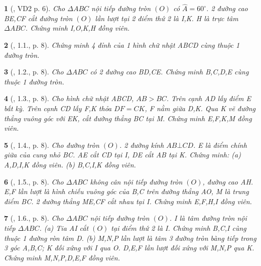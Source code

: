 \documentclass{article}
\newtheorem{baitoan}{}
\begin{document}
\begin{baitoan}[\cite{Thu_Chung_Viet_Minh_circ}, VD2 p. 6]
	Cho $\Delta ABC$ nội tiếp đường tròn $(O)$ có $\widehat{A} = 60^\circ$. 2 đường cao BE,CF cắt đường tròn $(O)$ lần lượt tại 2 điểm thứ 2 là I,K. H là trực tâm $\Delta ABC$. Chứng minh I,O,K,H đồng viên.
\end{baitoan}

\begin{baitoan}[\cite{Thu_Chung_Viet_Minh_circ}, 1.1., p. 8]
	Chứng minh 4 đỉnh của 1 hình chữ nhật ABCD cùng thuộc 1 đường tròn.
\end{baitoan}

\begin{baitoan}[\cite{Thu_Chung_Viet_Minh_circ}, 1.2., p. 8]
	Cho $\Delta ABC$ có 2 đường cao BD,CE. Chứng minh B,C,D,E cùng thuộc 1 đường tròn.
\end{baitoan}

\begin{baitoan}[\cite{Thu_Chung_Viet_Minh_circ}, 1.3., p. 8]
	Cho hình chữ nhật ABCD, $AB > BC$. Trên cạnh AD lấy điểm E bất kỳ. Trên cạnh CD lấy F,K thỏa $DF = CK$, F nằm giữa D,K. Qua K vẽ đường thẳng vuông góc với EK, cắt đường thẳng BC tại M. Chứng minh E,F,K,M đồng viên.
\end{baitoan}

\begin{baitoan}[\cite{Thu_Chung_Viet_Minh_circ}, 1.4., p. 8]
	Cho đường tròn $(O)$. 2 đường kính $AB\bot CD$. E là điểm chính giữa của cung nhỏ BC. AE cắt CD tại I, DE cắt AB tại K. Chứng minh: (a) A,D,I,K đồng viên. (b) B,C,I,K đồng viên.
\end{baitoan}

\begin{baitoan}[\cite{Thu_Chung_Viet_Minh_circ}, 1.5., p. 8]
	Cho $\Delta ABC$ không cân nội tiếp đường tròn $(O)$, đường cao AH. E,F lần lượt là hình chiếu vuông góc của B,C trên đường thẳng AO, M là trung điểm BC. 2 đường thẳng ME,CF cắt nhau tại I. Chứng minh E,F,H,I đồng viên.
\end{baitoan}

\begin{baitoan}[\cite{Thu_Chung_Viet_Minh_circ}, 1.6., p. 8]
	Cho $\Delta ABC$ nội tiếp đường tròn $(O)$. I là tâm đường tròn nội tiếp $\Delta ABC$. (a) Tia AI cắt $(O)$ tại điểm thứ 2 là I. Chứng minh B,C,I cùng thuộc 1 đường ròn tâm D. (b) M,N,P lần lượt là tâm 3 đường tròn bàng tiếp trong 3 góc A,B,C; K đối xứng với I qua O. D,E,F lần lượt đối xứng với M,N,P qua K. Chứng minh M,N,P,D,E,F đồng viên.
\end{baitoan}
\end{document}
